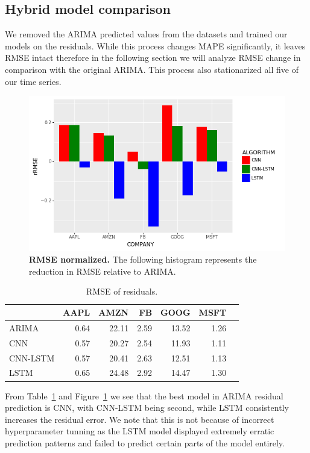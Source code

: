 \documentclass[12pt,journal,compsoc]{IEEEtran}
\begin{document}
\subsection{Hybrid model comparison}
\par We removed the ARIMA predicted values from the datasets and trained our models on the residuals.
While this process changes MAPE significantly, it leaves RMSE intact therefore in the following section we will analyze RMSE change in comparison with the original ARIMA. 
This process also stationarized all five of our time series.
\begin{figure}[!ht]\centering
	\includegraphics[width=\linewidth]{images/fig2.png}
	\caption{\textbf{RMSE normalized.} The following histogram represents the reduction in RMSE relative to ARIMA.}
	\label{fig:res2}
\end{figure}
\begin{table}[hbt]
	\caption{RMSE of residuals.}
	\centering
    \begin{tabular}{|l|r|r|r|r|r|r|}
    \toprule
    \hline
    {} &  AAPL &   AMZN &    FB &   GOOG & MSFT \\
    \hline
    \midrule
    ARIMA     &  0.64 &  22.11 &  2.59 &  13.52 &  1.26 \\
    CNN       &  0.57 &  20.27 &  2.54 &  11.93 &  1.11 \\
    CNN-LSTM  &  0.57 &  20.41 &  2.63 &  12.51 &  1.13 \\
    LSTM      &  0.65 &  24.48 &  2.92 &  14.47 &  1.30 \\
    \hline
    \bottomrule
    \end{tabular}
	\label{tab:res2}
\end{table}
\par From Table~\ref{fig:res2} and Figure~\ref{tab:res2} we see that the best model in ARIMA residual prediction is CNN, with CNN-LSTM being second,
while LSTM consistently increases the residual error.
We note that this is not because of incorrect hyperparameter tunning as the LSTM model displayed extremely erratic prediction patterns and failed to predict certain parts of the model entirely.
\end{document}
